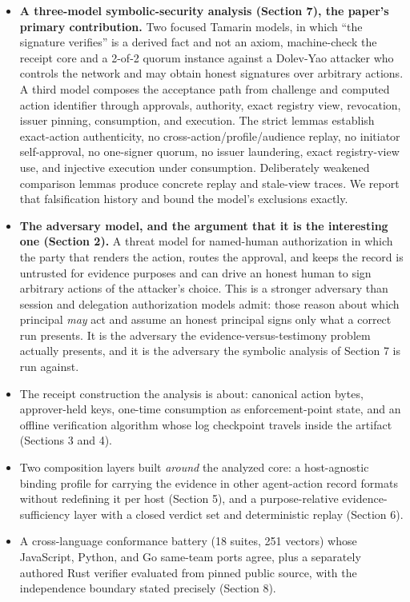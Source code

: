 \documentclass[11pt]{article}
\begin{document}
\begin{itemize}[leftmargin=*]
\item \textbf{A three-model symbolic-security analysis (Section 7), the paper's
primary contribution.} Two focused Tamarin models, in which ``the signature
verifies'' is a derived fact and not an axiom, machine-check the receipt core and
a 2-of-2 quorum instance against a Dolev-Yao attacker who controls the network
and may obtain honest signatures over arbitrary actions. A third model composes
the acceptance path from challenge and computed action identifier through
approvals, authority, exact registry view, revocation, issuer pinning,
consumption, and execution. The strict lemmas establish exact-action
authenticity, no cross-action/profile/audience replay, no initiator
self-approval, no one-signer quorum, no issuer laundering, exact registry-view
use, and injective execution under consumption. Deliberately weakened comparison
lemmas produce concrete replay and stale-view traces. We report that
falsification history and bound the model's exclusions exactly.
\item \textbf{The adversary model, and the argument that it is the interesting
one (Section 2).} A threat model for named-human authorization in which the party
that renders the action, routes the approval, and keeps the record is untrusted
for evidence purposes and can drive an honest human to sign arbitrary actions of
the attacker's choice. This is a stronger adversary than session and delegation
authorization models admit: those reason about which principal \emph{may} act and
assume an honest principal signs only what a correct run presents. It is the
adversary the evidence-versus-testimony problem actually presents, and it is the
adversary the symbolic analysis of Section 7 is run against.
\item The receipt construction the analysis is about: canonical action bytes,
approver-held keys, one-time consumption as enforcement-point state, and an
offline verification algorithm whose log checkpoint travels inside the artifact
(Sections 3 and 4).
\item Two composition layers built \emph{around} the analyzed core: a
host-agnostic binding profile for carrying the evidence in other agent-action
record formats without redefining it per host (Section 5), and a purpose-relative
evidence-sufficiency layer with a closed verdict set and deterministic replay
(Section 6).
\item A cross-language conformance battery (18 suites, 251 vectors) whose
JavaScript, Python, and Go same-team ports agree, plus a separately authored Rust
verifier evaluated from pinned public source, with the independence boundary
stated precisely (Section 8).
\end{itemize}
\end{document}
